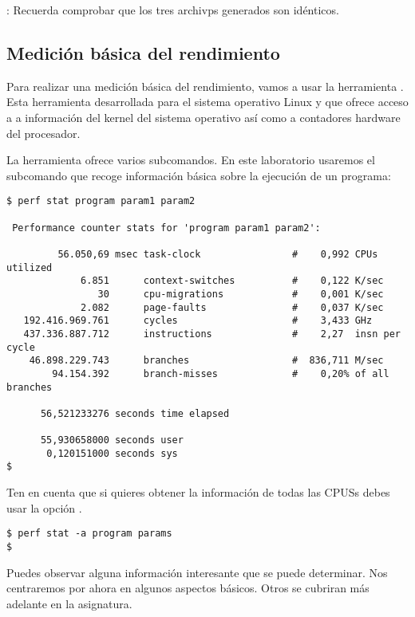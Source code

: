 : Recuerda comprobar que los tres archivps 
generados son idénticos.

\subsection{Medición básica del rendimiento}

Para realizar una medición básica del rendimiento, vamos a usar la
herramienta . Esta herramienta desarrollada para el sistema
operativo Linux y que ofrece acceso a a información del kernel
del sistema operativo así como a contadores hardware del procesador.

La herramienta  ofrece varios subcomandos. En este
laboratorio usaremos el subcomando  que recoge información
básica sobre la ejecución de un programa:

\begin{lstlisting}[style=terminal,basicstyle=\ttfamily]
$ perf stat program param1 param2

 Performance counter stats for 'program param1 param2':

         56.050,69 msec task-clock                #    0,992 CPUs utilized          
             6.851      context-switches          #    0,122 K/sec                  
                30      cpu-migrations            #    0,001 K/sec                  
             2.082      page-faults               #    0,037 K/sec                  
   192.416.969.761      cycles                    #    3,433 GHz                    
   437.336.887.712      instructions              #    2,27  insn per cycle         
    46.898.229.743      branches                  #  836,711 M/sec                  
        94.154.392      branch-misses             #    0,20% of all branches        

      56,521233276 seconds time elapsed

      55,930658000 seconds user
       0,120151000 seconds sys
$
\end{lstlisting}

Ten en cuenta que si quieres obtener la información de todas las CPUSs
debes usar la opción .

\begin{lstlisting}[style=terminal]
$ perf stat -a program params
$
\end{lstlisting}

Puedes observar alguna información interesante que se puede determinar.
Nos centraremos por ahora en algunos aspectos básicos. Otros se
cubriran más adelante en la asignatura.

